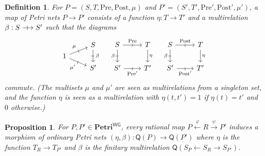 \documentclass[10pt,a4paper]{amsart}
\newtheorem{definition}{Definition}
\newtheorem{proposition}{Proposition}
\newcommand{\Post}{\mathrm{Post}}
\newcommand{\Pre}{\mathrm{Pre}}
\newcommand{\Q}{\mathsf{Q}}
\newcommand{\WGPetri}{\mathbf{Petri}^{\mathsf{WG}}}
\newcommand{\profto}{\mathrel{\ooalign{$\longrightarrow$\cr\hfil\!\raisebox{-1.2pt}{\rotatebox{90}{$-$}}\hfil\cr}}}
\begin{document}
\begin{definition}
  \label{def:morphisms-petri}
  For $P = (S, T, \Pre, \Post, \mu)$ and
  $P' = (S', T', \Pre', \Post', \mu')$, a \emph{map of Petri nets}
  $P \to P'$ consists of a function $\eta : T \rightarrow T'$  and a multirelation $\beta : S \profto S'$ such
  that the diagrams
\[\begin{tikzcd}[row sep=0.2em]
	& S \\
	1 \\
	& {S'}
	\arrow["\beta"{inner sep=.8ex}, "\shortmid"{marking}, from=1-2, to=3-2]
	\arrow["\mu"{inner sep=.8ex}, "\shortmid"{marking}, from=2-1, to=1-2]
	\arrow["{\mu'}"'{inner sep=.8ex}, "\shortmid"{marking}, from=2-1, to=3-2]
\end{tikzcd}
\quad
\begin{tikzcd}
	S & T \\
	{S'} & {T'}
	\arrow["\Pre"{inner sep=.8ex}, "\shortmid"{marking}, from=1-1, to=1-2]
	\arrow["\beta"'{inner sep=.8ex}, "\shortmid"{marking}, from=1-1, to=2-1]
	\arrow["\eta", from=1-2, to=2-2]
	\arrow["{\Pre'}"'{inner sep=.8ex}, "\shortmid"{marking}, from=2-1, to=2-2]
\end{tikzcd}\quad
\begin{tikzcd}
	S & T \\
	{S'} & {T'}
	\arrow["\Post"{inner sep=.8ex}, "\shortmid"{marking}, from=1-1, to=1-2]
	\arrow["\beta"'{inner sep=.8ex}, "\shortmid"{marking}, from=1-1, to=2-1]
	\arrow["\eta", from=1-2, to=2-2]
	\arrow["{\Post'}"'{inner sep=.8ex}, "\shortmid"{marking}, from=2-1, to=2-2]
\end{tikzcd}
\]
commute. (The multisets $\mu$ and $\mu'$ are seen as multirelations from a singleton set, and the function $\eta$ is seen as a multirelation with
$\eta(t, t') = 1$ if $\eta(t) = t'$ and $0$ otherwise.)
\end{definition}

\begin{proposition}
 \label{prop:Qonmor}
  For $P, P' \in \WGPetri$, every rational map $P \xleftarrow{\varphi} R \xrightarrow{\psi} P'$
  induces a morphism of ordinary Petri nets $(\eta, \beta): \Q(P) \to \Q(P')$ where $\eta$ is the
  function $T_R \to T_{P'}$ and $\beta$ is the finitary multirelation
  $\Q(S_P \leftarrow S_R \to S_{P'})$.
\end{proposition}
\end{document}

